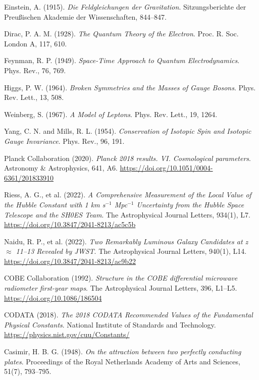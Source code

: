 \documentclass[12pt,a4paper]{article}
\theoremstyle{definition}
\begin{document}
\begin{thebibliography}{99}
	Einstein, A. (1915). 
	\textit{Die Feldgleichungen der Gravitation}. 
	Sitzungsberichte der Preu\ss{}ischen Akademie der Wissenschaften, 844--847.
	
	Dirac, P. A. M. (1928). 
	\textit{The Quantum Theory of the Electron}. 
	Proc. R. Soc. London A, 117, 610.
	
	Feynman, R. P. (1949). 
	\textit{Space-Time Approach to Quantum Electrodynamics}. 
	Phys. Rev., 76, 769.
	
	Higgs, P. W. (1964).
	\textit{Broken Symmetries and the Masses of Gauge Bosons}.
	Phys. Rev. Lett., 13, 508.
	
	Weinberg, S. (1967).
	\textit{A Model of Leptons}.
	Phys. Rev. Lett., 19, 1264.
	
	Yang, C. N. and Mills, R. L. (1954).
	\textit{Conservation of Isotopic Spin and Isotopic Gauge Invariance}.
	Phys. Rev., 96, 191.
	
	Planck Collaboration (2020). 
	\textit{Planck 2018 results. VI. Cosmological parameters}. 
	Astronomy \& Astrophysics, 641, A6. 
	\url{https://doi.org/10.1051/0004-6361/201833910}
	
	Riess, A. G., et al. (2022). 
	\textit{A Comprehensive Measurement of the Local Value of the Hubble Constant with 1 km s$^{-1}$ Mpc$^{-1}$ Uncertainty from the Hubble Space Telescope and the SH0ES Team}. 
	The Astrophysical Journal Letters, 934(1), L7. 
	\url{https://doi.org/10.3847/2041-8213/ac5c5b}
	
	Naidu, R. P., et al. (2022). 
	\textit{Two Remarkably Luminous Galaxy Candidates at z $\approx$ 11--13 Revealed by JWST}. 
	The Astrophysical Journal Letters, 940(1), L14. 
	\url{https://doi.org/10.3847/2041-8213/ac9b22}
	
	COBE Collaboration (1992). 
	\textit{Structure in the COBE differential microwave radiometer first-year maps}. 
	The Astrophysical Journal Letters, 396, L1--L5. 
	\url{https://doi.org/10.1086/186504}
	
	CODATA (2018). 
	\textit{The 2018 CODATA Recommended Values of the Fundamental Physical Constants}. 
	National Institute of Standards and Technology. 
	\url{https://physics.nist.gov/cuu/Constants/}
	
	Casimir, H. B. G. (1948). 
	\textit{On the attraction between two perfectly conducting plates}. 
	Proceedings of the Royal Netherlands Academy of Arts and Sciences, 51(7), 793--795.
	

\end{thebibliography}
\end{document}
